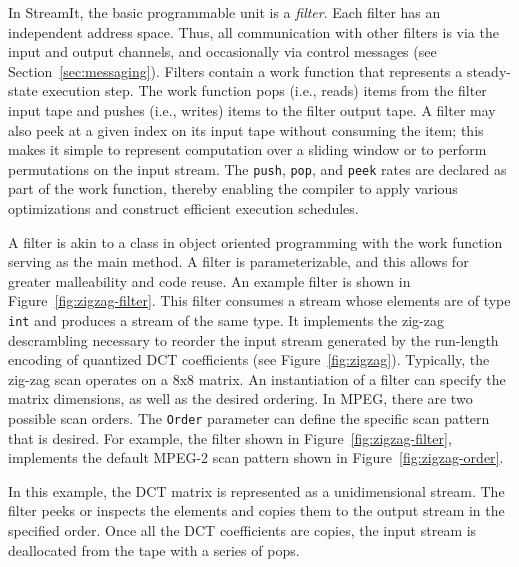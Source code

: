 In StreamIt, the basic programmable unit is a {\it filter}.  Each
filter has an independent address space. Thus, all communication with
other filters is via the input and output channels, and occasionally
via control messages (see Section~\ref{sec:messaging}).  Filters
contain a work function that represents a steady-state execution step.
The work function pops (i.e., reads) items from the filter input tape
and pushes (i.e., writes) items to the filter output tape. A filter
may also peek at a given index on its input tape without consuming the
item; this makes it simple to represent computation over a sliding
window or to perform permutations on the input stream. The {\tt push},
{\tt pop}, and {\tt peek} rates are declared as part of the work
function, thereby enabling the compiler to apply various optimizations
and construct efficient execution schedules.

A filter is akin to a class in object oriented programming with the
work function serving as the main method. A filter is parameterizable,
and this allows for greater malleability and code reuse. An example
filter is shown in Figure~\ref{fig:zigzag-filter}. This filter
consumes a stream whose elements are of type {\tt int} and produces a
stream of the same type. It implements the zig-zag descrambling
necessary to reorder the input stream generated by the run-length
encoding of quantized DCT coefficients (see
Figure~\ref{fig:zigzag}). Typically, the zig-zag scan operates on a
8x8 matrix. An instantiation of a filter can specify the matrix
dimensions, as well as the desired ordering. In MPEG, there are two
possible scan orders. The {\tt Order} parameter can define the
specific scan pattern that is desired. For example, the filter shown
in Figure~\ref{fig:zigzag-filter}, implements the default MPEG-2 scan
pattern shown in Figure~\ref{fig:zigzag-order}.

In this example, the DCT matrix is represented as a unidimensional
stream. The filter peeks or inspects the elements and copies them to
the output stream in the specified order. Once all the DCT
coefficients are copies, the input stream is deallocated from the tape
with a series of pops.

